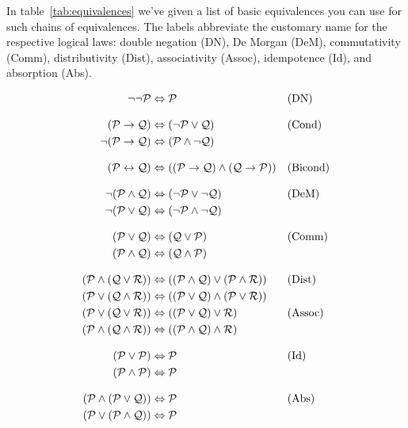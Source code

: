 In table~\ref{tab:equivalences} we've given a list of basic equivalences you can use for such chains of equivalences. The labels abbreviate the customary name for the respective logical laws: double negation (DN), De Morgan (DeM), commutativity (Comm), distributivity (Dist), associativity (Assoc), idempotence (Id), and absorption (Abs).

\begin{table}
	\begin{align*}
\lnot\lnot \metav{P} & \Leftrightarrow \metav{P} && \text{(DN)}\\[2ex]
(\metav{P} \eif \metav{Q}) & \Leftrightarrow (\lnot \metav{P} \lor \metav{Q})
&& \text{(Cond)}\\
\lnot(\metav{P} \eif \metav{Q}) & \Leftrightarrow (\metav{P} \land \lnot\metav{Q}) \\[2ex]
(\metav{P} \eiff \metav{Q}) & \Leftrightarrow ((\metav{P} \eif \metav{Q}) \land  (\metav{Q} \eif \metav{P}))
&& \text{(Bicond)}\\[2ex]
\lnot(\metav{P} \land \metav{Q}) & \Leftrightarrow (\lnot\metav{P} \lor \lnot\metav{Q})
&& \text{(DeM)}\\
\lnot(\metav{P} \lor \metav{Q}) & \Leftrightarrow (\lnot\metav{P} \land \lnot\metav{Q}) \\[2ex]
(\metav{P} \lor \metav{Q}) & \Leftrightarrow (\metav{Q} \lor \metav{P}) & &\text{(Comm)}\\
(\metav{P} \land \metav{Q}) & \Leftrightarrow (\metav{Q} \land \metav{P})\\[2ex]
(\metav{P} \land (\metav{Q} \lor \metav{R})) & \Leftrightarrow ((\metav{P} \land \metav{Q}) \lor (\metav{P} \land \metav{R}))
&& \text{(Dist)}\\
(\metav{P} \lor (\metav{Q} \land \metav{R})) & \Leftrightarrow ((\metav{P} \lor \metav{Q}) \land (\metav{P} \lor \metav{R}))\\
(\metav{P} \lor (\metav{Q} \lor \metav{R})) & \Leftrightarrow ((\metav{P} \lor \metav{Q}) \lor \metav{R}) & &\text{(Assoc)}\\
(\metav{P} \land (\metav{Q} \land \metav{R})) & \Leftrightarrow ((\metav{P} \land \metav{Q}) \land \metav{R})\\[2ex]
(\metav{P} \lor \metav{P}) & \Leftrightarrow \metav{P} && \text{(Id)}\\
(\metav{P} \land \metav{P}) & \Leftrightarrow \metav{P}\\[2ex]
(\metav{P} \land (\metav{P} \lor \metav{Q})) & \Leftrightarrow \metav{P}&& \text{(Abs)}\\
(\metav{P} \lor (\metav{P} \land \metav{Q})) & \Leftrightarrow \metav{P}\\[2ex]

\end{align*}
\end{table}
